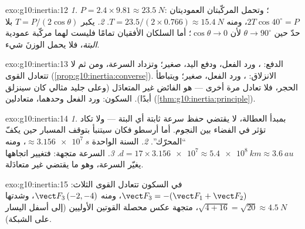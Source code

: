 \begin{solution}{exo:g10:inertia:12}
\emph{1.} $P = 2.4 \times 9.81 \approx \qty{23.5}{N}$؛ وتحمل المركّبتان
العموديتان : $2T\cos 40^\circ = P$، ومنه
$T = 23.5/(2 \times 0.766) \approx \qty{15.4}{N}$. \emph{2.}
يكبر $T = P/(2\cos\theta)$ بلا حدّ حين $\theta \to 90^\circ$
لأن $\cos\theta \to 0$؛ أما السلكان الأفقيان تمامًا فليست لهما مركّبة
عمودية \emph{البتة}، فلا يحمل الوزنَ شيء.
\end{solution}

\begin{solution}{exo:g10:inertia:13}
الدفع: ، ورد الفعل، ودفع اليد،  صغير؛ وتزداد السرعة،
ومن ثم لا تتعادل القوى
(\cref{prop:g10:inertia:converse}). الانزلاق: ، ورد الفعل، 
صغير؛ ويتباطأ الحجر، فلا تعادل مرة أخرى ---  هو
الفائض غير المتعادَل (وعلى جليد مثالي كان سينزلق أبدًا). السكون:
 ورد الفعل وحدهما، متعادلين
(\cref{thm:g10:inertia:principle}).
\end{solution}

\begin{solution}{exo:g10:inertia:14}
\emph{1.} بمبدأ العطالة، لا يقتضي حفظ سرعة ثابتة
أي  البتة --- ولا تكاد تؤثر  في الفضاء بين النجوم.
أما أرسطو فكان سيتنبأ بتوقف المسبار حين يكفّ
``المحرّك''. \emph{2.} السنة الواحدة $\approx \qty{3.156e7}{s}$، ومنه
$d = 17 \times \num{3.156e7} \approx \qty{5.4e8}{km} \approx
\qty{3.6}{au}$. \emph{3.} السرعة متجهة: فتغيير اتجاهها
يغيّر السرعة، وهو ما يقتضي  غير متعادَلة.
\end{solution}

\begin{solution}{exo:g10:inertia:15}
في السكون تتعادل القوى الثلاث:
$\vect F_3 = -(\vect F_1 + \vect F_2)$، ومنه $\vect F_3\,(-2, -4)$،
وشدتها $\sqrt{4 + 16} = \sqrt{20} \approx \qty{4.5}{N}$، متجهة
عكس محصلة القوتين الأوليين (إلى أسفل اليسار على الشبكة).
\end{solution}

